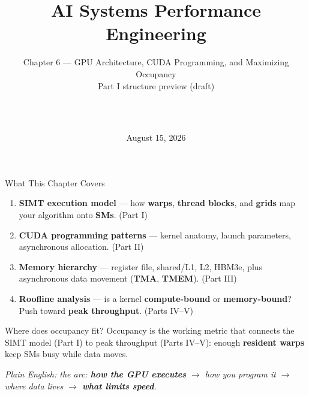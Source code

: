 \documentclass[aspectratio=169]{beamer}
\title[AI Systems Performance Engineering]{AI Systems Performance Engineering}
\subtitle{Chapter 6 --- GPU Architecture, CUDA Programming, and Maximizing Occupancy\\{\small Part I structure preview (draft)}}
\author[\PresenterName\ \ \PresenterTitle\ \ \PresenterOrg]{\PresenterName\\\PresenterTitle\\\PresenterOrg}
\institute[]{\footnotesize Internal Training for Applied Scientists on AI Infrastructure}
\date{August 15, 2026}
\newcommand{\kw}[1]{\textbf{\textcolor{kwblue}{#1}}}
\newcommand{\pe}[1]{\par{\setlength{\fboxsep}{2.5pt}\noindent\colorbox{navy!9}{\parbox{\dimexpr\textwidth-5pt\relax}{\footnotesize\itshape Plain English: #1}}}}
\begin{document}
\begin{frame}
  \titlepage
\end{frame}

\begin{frame}{What This Chapter Covers}
  \begin{enumerate}
    \item \kw{SIMT execution model} --- how \kw{warps}, \kw{thread blocks}, and \kw{grids}
          map your algorithm onto \kw{SMs}. \hfill (Part I)
    \item \kw{CUDA programming patterns} --- kernel anatomy, launch parameters,
          asynchronous allocation. \hfill (Part II)
    \item \kw{Memory hierarchy} --- register file, shared/L1, L2, HBM3e, plus
          asynchronous data movement (\kw{TMA}, \kw{TMEM}). \hfill (Part III)
    \item \kw{Roofline analysis} --- is a kernel \kw{compute-bound} or \kw{memory-bound}?
          Push toward \kw{peak throughput}. \hfill (Parts IV--V)
  \end{enumerate}
  \medskip
  \begin{block}{Where does occupancy fit?}
    \small Occupancy is the working metric that connects the SIMT model (Part I) to peak
    throughput (Parts IV--V): enough \kw{resident warps} keep SMs busy while data moves.
  \end{block}
  \pe{the arc: \kw{how the GPU executes} $\to$ how you program it $\to$ where data lives $\to$ \kw{what limits speed}.}
\end{frame}
\end{document}
